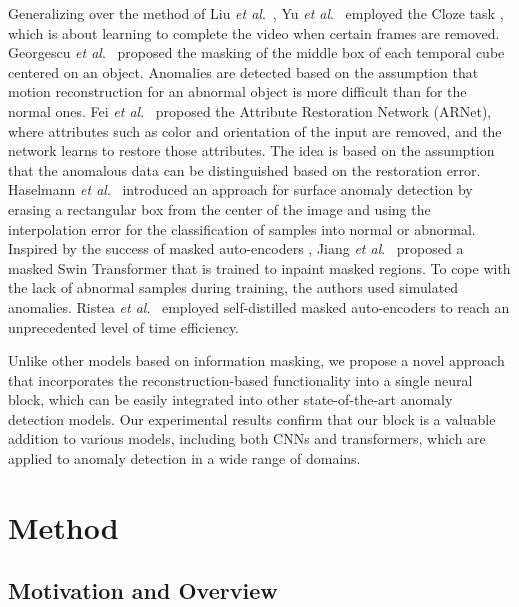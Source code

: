 \documentclass[10pt,journal,compsoc]{IEEEtran}
\newcommand{\etal}{\textit{et al}.}
\begin{document}
Generalizing over the method of Liu \etal~\cite{Liu-CVPR-2018}, Yu \etal~\cite{Yu-ACMMM-2020} employed the Cloze task \cite{Luo-Arxiv-2020}, which is about learning to complete the video when certain frames are removed. Georgescu \etal~\cite{Georgescu-CVPR-2021} proposed the masking of the middle box of each temporal cube centered on an object. Anomalies are detected based on the assumption that motion reconstruction for an abnormal object is more difficult than for the normal ones. Fei \etal~\cite{Fei-TMM-2020} proposed the Attribute Restoration Network (ARNet), where attributes such as color and orientation of the input are removed, and the network learns to restore those attributes. The idea is based on the assumption that the anomalous data can be distinguished based on the restoration error. Haselmann \etal~\cite{Haselmann-ICMLA-2018} introduced an approach for surface anomaly detection by erasing a rectangular box from the center of the image and using the interpolation error for the classification of samples into normal or abnormal. Inspired by the success of masked auto-encoders \cite{He-CVPR-2022}, Jiang \etal~\cite{Jiang-TII-2023} proposed a masked Swin Transformer \cite{Liu-ICCV-2021b} that is trained to inpaint masked regions. To cope with the lack of abnormal samples during training, the authors used simulated anomalies. Ristea \etal~\cite{Ristea-Arxiv-2023} employed self-distilled masked auto-encoders to reach an unprecedented level of time efficiency.

Unlike other models based on information masking, we propose a novel approach that incorporates the reconstruction-based functionality into a single neural block, which can be easily integrated into other state-of-the-art anomaly detection models. Our experimental results confirm that our block is a valuable addition to various models, including both CNNs and transformers, which are applied to anomaly detection in a wide range of domains.

\section{Method}

\subsection{Motivation and Overview}
\end{document}
